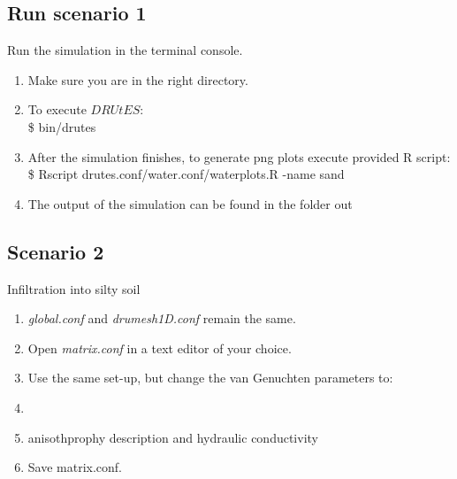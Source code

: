 \subsection*{Run scenario 1}
Run the simulation in the terminal console.
\begin{enumerate}
\item Make sure you are in the right directory. 
\item To execute $DRUtES$: \\
\$ bin/drutes
\item After the simulation finishes, to generate png plots execute provided R script: \\
\$ Rscript drutes.conf/water.conf/waterplots.R -name sand
\item The output of the simulation can be found in the folder out
\end{enumerate}

\subsection*{Scenario 2}
Infiltration into silty soil
\begin{enumerate}
\item \emph{global.conf} and \emph{drumesh1D.conf} remain the same.
\item Open \emph{matrix.conf} in a text editor of your choice. 
\item Use the same set-up, but change the van Genuchten parameters to:
\item {}
\item anisothprophy description and hydraulic conductivity\\ 
\item Save matrix.conf.
\end{enumerate}

